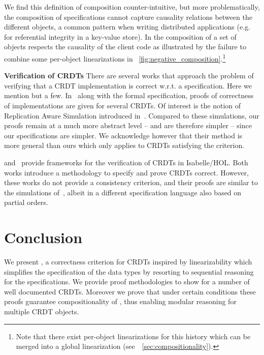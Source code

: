 \begin{inparaenum}
  We find this definition of composition counter-intuitive, but more
  problematically, the composition of specifications cannot capture
  causality relations between the different objects, a common
  pattern when writing distributed applications (e.g. for referential
  integrity in a key-value store).
  In \CRDTLinshort{} the composition of a set of objects respects the
  causality of the client code as illustrated by the failure to combine
  some per-object linearizations in
  \figureautorefname~\ref{fig:negative_composition}.\footnote{Note that
    there exist per-object linearizations for this history which can be
    merged into a global linearization
    (see~\sectionautorefname~\ref{sec:compositionality}).}
\end{inparaenum}

\smallskip
\noindent
{\bf Verification of CRDTs}
There are several works that approach the problem of verifying that a
CRDT implementation is correct w.r.t. a specification.
%
Here we mention but a few.
%
In~\cite{BurckhardtGYZ14, AttiyaBGMYZ16, Burckhardt14} along with the
formal specification, proofs of correctness of implementations are
given for several CRDTs.
%
Of interest is the notion of Replication Aware Simulation introduced
in~\cite{BurckhardtGYZ14}.
%
Compared to these simulations, our proofs remain at a much more
abstract level -- and are therefore simpler -- since our
specifications are simpler.
%
We acknowledge however that their method is more general than ours
which only applies to CRDTs satisfying the \CRDTLinshort{} criterion.

\citet{ZellerBP14} and~\citet{GomesKMB17} provide frameworks for the
verification of CRDTs in Isabelle/HOL\@.
%
Both works introduce a methodology to specify and prove CRDTs
correct.
%
However, these works do not provide a consistency criterion, and their
proofs are similar to the simulations of~\cite{BurckhardtGYZ14},
albeit in a different specification language also based on partial
orders.

\section{Conclusion}
\label{sec:conclusion}

We present \CRDTLin{}, a correctness criterion for CRDTs
inspired by linearizability which simplifies the specification of the
data types by resorting to sequential reasoning for the
specifications.
%
We provide proof methodologies to show \CRDTLinshort{} for a number of
well documented CRDTs.
%
Moreover we prove that under certain conditions these proofs guarantee
compositionality of \CRDTLinshort{}, thus enabling modular reasoning
for multiple CRDT objects.
%

